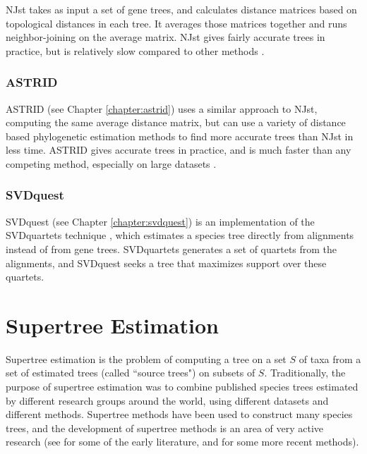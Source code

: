 \documentclass[tocnosub,noragright,centerchapter,fullpagesingle,12pt]{uiuc_csthesis18}
\begin{document}
NJst takes as input a set of gene trees, and calculates distance matrices based on topological distances in each tree. It averages those matrices together and runs neighbor-joining \cite{saitou1987neighbor} on the average matrix. NJst gives fairly accurate trees in practice, but is relatively slow compared to other methods \cite{davidson2015phylogenomic}.

\subsubsection{ASTRID}

ASTRID (see Chapter \ref{chapter:astrid}) uses a similar approach to NJst, computing the same average distance matrix, but can use a variety of distance based phylogenetic estimation methods to find more accurate trees than NJst in less time. ASTRID gives accurate trees in practice, and is much faster than any competing method, especially on large datasets \cite{vachaspati2015astrid}.

\subsubsection{SVDquest}

SVDquest (see Chapter \ref{chapter:svdquest}) is an implementation of the SVDquartets technique \cite{svdquartets}, which  estimates a species tree directly from alignments instead of from gene trees. SVDquartets generates a set of quartets from the alignments, and SVDquest seeks a tree that maximizes support over these quartets.

\section{Supertree Estimation}


Supertree estimation \cite{warnow2018supertree} is the problem of computing a tree on a set $S$ of taxa from a set of estimated  trees (called ``source trees") on subsets of $S$. 
Traditionally, the purpose of supertree estimation was 
to combine published species trees estimated by different research groups around the world, using different datasets and different methods. 
Supertree methods have been used
to construct many species trees,
and the development of supertree methods is an area 
of very active research
(see 
\cite{bininda2004phylogenetic} for some of the early literature,
and \cite{mrl,superfine,Akanni-MLsupertree} for some more recent methods).
\end{document}
